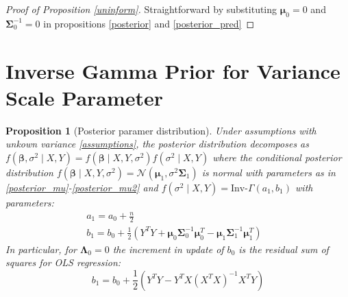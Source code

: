 \documentclass[10pt,fleqn]{amsart}
\newtheorem{proposition}[theorem]{Proposition}
\theoremstyle{definition}
\theoremstyle{remark}
\numberwithin{equation}{section}
\newcommand{\bbeta}{\boldsymbol{\beta}}
\newcommand{\mmu}{\boldsymbol{\mu}}
\newcommand{\SSigma}{\boldsymbol{\Sigma}}
\newcommand{\LLambda}{\boldsymbol{\Lambda}}
\newcommand{\XTXi}{\left(X^TX\right)^{-1}}
\newcommand{\invGamma}{\text{Inv-}\Gamma}
\begin{document}
\begin{proof}[Proof of Proposition \ref{uninform}]
Straightforward by substituting $\mmu_0=0$ and $\SSigma_0^{-1}=0$ in propositions \ref{posterior} and \ref{posterior_pred}
\end{proof}

\section{Inverse Gamma Prior for Variance Scale Parameter}
\begin{proposition}[Posterior paramer distribution]\label{posterior_var}
    Under assumptions with unkown variance \ref{assumptions}, the posterior distribution decomposes as
    $f(\bbeta,\sigma^2\mid X, Y)=f(\bbeta\mid X, Y, \sigma^2)f(\sigma^2\mid X, Y)$ where the conditional posterior distribution $f(\bbeta\mid X, Y, \sigma^2)=\mathcal{N}(\mmu_1, \sigma^2\SSigma_1)$
    is normal with parameters as in \ref{posterior_mu}-\ref{posterior_mu2} and $f(\sigma^2\mid X, Y)=\invGamma(a_1, b_1)$
    with parameters:
    \begin{align}
        \label{posterior_sigsq}&a_1=a_0+\frac n 2&&\\
        \label{posterior_sigsq2}&b_1=b_0+\frac 12\left(Y^TY+\mmu_0\SSigma_0^{-1}\mmu_0^T-\mmu_1\SSigma_1^{-1}\mmu_1^T\right)&&
    \end{align}
    In particular, for $\LLambda_0=0$ the increment in update of $b_0$ is the residual sum of squares for OLS regression:
    \begin{equation*}
        b_1=b_0+\frac 12 (Y^TY-Y^TX\XTXi X^TY)
    \end{equation*}
\end{proposition}
\end{document}
